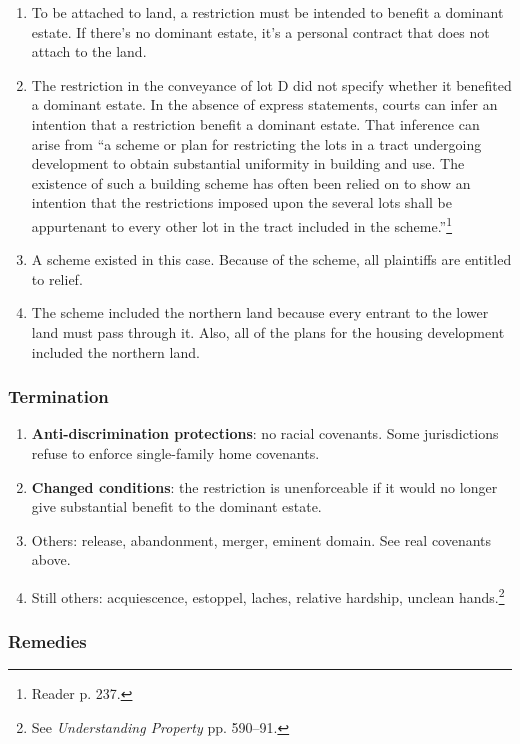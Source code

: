 \begin{enumerate}
    buildings on its land.\footnote{Reader p. 235.}
    \item To be attached to land, a restriction must be intended to benefit a 
    dominant estate. If there's no dominant estate, it's a personal contract 
    that does not attach to the land.
    \item The restriction in the conveyance of lot D did not specify whether 
    it benefited a dominant estate. In the absence of express statements, 
    courts can infer an intention that a restriction benefit a dominant 
    estate. That inference can arise from ``a scheme or plan for restricting 
    the lots in a tract undergoing development to obtain substantial 
    uniformity in building and use. The existence of such a building scheme 
    has often been relied on to show an intention that the restrictions 
    imposed upon the several lots shall be appurtenant to every other lot in 
    the tract included in the scheme.''\footnote{Reader p. 237.}
    \item A scheme existed in this case. Because of the scheme, all plaintiffs 
    are entitled to relief.
    \item The scheme included the northern land because every entrant to the 
    lower land must pass through it. Also, all of the plans for the housing 
    development included the northern land.
\end{enumerate}

\subsubsection{Termination}

\begin{enumerate}
    \item \textbf{Anti-discrimination protections}: no racial covenants. Some 
    jurisdictions refuse to enforce single-family home covenants.
    \item \textbf{Changed conditions}: the restriction is unenforceable if it 
    would no longer give substantial benefit to the dominant estate.
    \item Others: release, abandonment, merger, eminent domain. See real 
    covenants above.
    \item Still others: acquiescence, estoppel, laches, relative hardship, 
    unclean hands.\footnote{See \emph{Understanding Property} pp. 590--91.}
\end{enumerate}

\subsubsection{Remedies}

